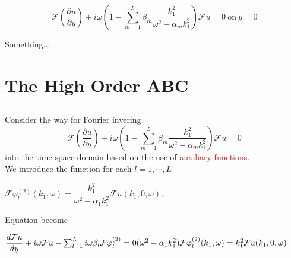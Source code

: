 \documentclass{beamer}%
\begin{document}
\frame
{
\small
$$\mathcal{F}\left(\dfrac{\partial u}{\partial y}\right)+i\omega\left(1-\sum_{m=1}^{L}\beta_m \dfrac{k_1^2}{\omega^2-\alpha_m k_1^2}\right)\mathcal{F}u=0~ \text{on}~y=0$$

Something...

}


\section{The High Order ABC}
\subsection{}
\frame
{
\small
\quad Consider the way for Fourier invering
$$\mathcal{F}\left(\dfrac{\partial u}{\partial y}\right)+i\omega\left(1-\sum_{m=1}^{L}\beta_m \dfrac{k_1^2}{\omega^2-\alpha_m k_1^2}\right)\mathcal{F}u=0$$
into the time space domain based on the use of \textcolor{red}{auxiliary functions}.\\
\vspace{10}
\quad We introduce the function for each $l=1,\cdots,L$
\begin{center}
$\mathcal{F}\varphi_l^{(2)}(k_1,\omega)=\dfrac{k_1^2}{\omega^2-\alpha_1k_1^2}\mathcal{F}u(k_1,0,\omega).$\\
\end{center}

\quad Equation become
\begin{block}{}
\begin{center}
$\dfrac{d\mathcal{F}u}{d y}+i\omega \mathcal{F}u- \sum_{l=1}^{L}i\omega\beta_l \mathcal{F}\varphi_l^{(2)}=0 \\
(\omega^2-\alpha_1k_1^2)\mathcal{F}\varphi_l^{(2)}(k_1,\omega)=k_1^2 \mathcal{F}u(k_1,0,\omega)$
\end{center}
\end{block}
}


\end{document}
